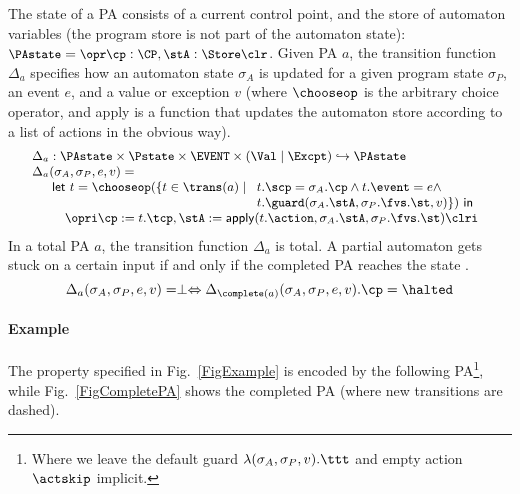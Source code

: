 The state of a PA consists of a current control point, and the store of
automaton variables (the program store is not part of the automaton state):
\({\small
\PAstate = \opr \cp : \CP, \stA : \Store \clr}
\). Given PA \(a\), the transition function \(\Delta_a\) specifies how
an automaton state \(\sigma_A\) is updated for a given program state
\(\sigma_P\), an event \(e\), and a value or exception \(v\) (where
\(\chooseop\) is the arbitrary choice operator, and \textsf{apply} is
a function that updates the automaton store according to a list of
actions in the obvious way).
\[{\small
\begin{array}{l}
\Delta_a  :  \PAstate \times \Pstate \times \EVENT \times (\Val \mid
\Excpt) \hookrightarrow
\PAstate\\
\Delta_a(\sigma_A, \sigma_P, e, v) = \\
\quad
\begin{array}[t]{l}
\mathsf{let\ }t = \chooseop(\{t\in \trans(a)\mid
  \begin{array}[t]{l}
     t.\scp = \sigma_A.\cp \wedge t.\event = e \wedge \\
     t.\guard(\sigma_A.\stA, \sigma_P.\fvs.\st, v)\}) \mathsf{\ in}
  \end{array}\\
\quad \opri \cp := t.\tcp, \stA := \mathsf{apply}(t.\action,
\sigma_A.\stA, \sigma_P.\fvs.\st) \clri
\end{array}

\end{array}}
\]
In a total PA $a$, the transition function \(\Delta_a\) is total.
A partial automaton gets stuck on a certain input if and only if the
completed PA reaches the state \halted.
\vspace*{-.5em}
\begin{equation}\label{PAcompletionProp}
\Delta_a(\sigma_A, \sigma_P, e, v) = \perp \Leftrightarrow
\Delta_{\complete(a)}(\sigma_A, \sigma_P, e, v).\cp = \halted
\end{equation}


\paragraph{Example}
The property specified in Fig.~\ref{FigExample} is encoded by the
following PA\footnote{Where we leave the default guard
\(\lambda(\sigma_A, \sigma_P, v). \ttt\) and  empty action
\(\actskip\) implicit.}, while Fig.~\ref{FigCompletePA} shows the
completed PA (where new transitions are dashed).


